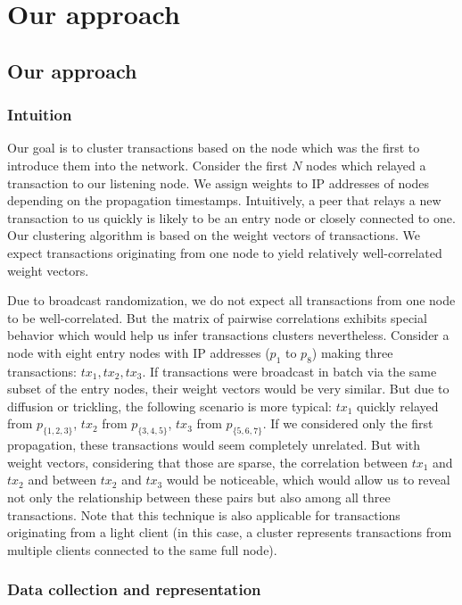 \section{Our approach}  \label{sec:Ch03_Our_approach}

\subsection{Our approach}

\subsubsection{Intuition}

Our goal is to cluster transactions based on the node which was the first to introduce them into the network.
Consider the first $N$ nodes which relayed a transaction to our listening node.
We assign weights to IP addresses of nodes depending on the propagation timestamps.
Intuitively, a peer that relays a new transaction to us quickly is likely to be an entry node or closely connected to one.
Our clustering algorithm is based on the weight vectors of transactions.
We expect transactions originating from one node to yield relatively well-correlated weight vectors.

Due to broadcast randomization, we do not expect all transactions from one node to be well-correlated.
But the matrix of pairwise correlations exhibits special behavior which would help us infer transactions clusters nevertheless.
Consider a node with eight entry nodes with IP addresses ($p_1$ to $p_8$) making three transactions: $tx_1, tx_2, tx_3$.
If transactions were broadcast in batch via the same subset of the entry nodes, their weight vectors would be very similar.
But due to diffusion or trickling, the following scenario is more typical: $tx_1$ quickly relayed from $p_{\{1,2,3\}}$, $tx_2$ from $p_{\{3,4,5\}}$, $tx_3$ from $p_{\{5,6,7\}}$.
If we considered only the first propagation, these transactions would seem completely unrelated.
But with weight vectors, considering that those are sparse, the correlation between $tx_1$ and $tx_2$ and between $tx_2$ and $tx_3$ would be noticeable, which would allow us to reveal not only the relationship between these pairs but also among all three transactions.
Note that this technique is also applicable for transactions originating from a light client (in this case, a cluster represents transactions from multiple clients connected to the same full node).

\subsubsection{Data collection and representation}

